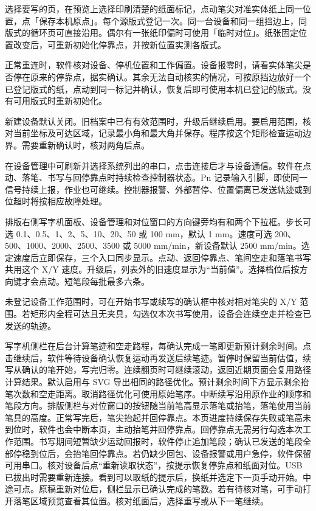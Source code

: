 选择要写的页，在预览上选择印刷清楚的纸面标记，点动笔尖对准实体纸上同一位置，点「保存本机原点」。每个源版式登记一次。同一台设备和同一组挡边上，同版式的循环页可直接沿用。偶尔有一张纸印偏时可使用「临时对位」。纸张固定位置改变后，可重新初始化停靠点，并按新位置实测各版式。

正常重连时，软件核对设备、停机位置和工作偏置。设备报零时，请看实体笔尖是否停在原来的停靠点，据实确认。其余无法自动核实的情况，可按原挡边放好一个已登记版式的纸，点动到同一标记并确认，恢复后即可使用本机已登记的版式。没有可用版式时重新初始化。

新建设备默认关闭。旧档案中已有有效范围时，升级后继续启用。要启用范围，核对当前坐标及可达区域，记录最小角和最大角并保存。程序按这个矩形检查运动边界。需要重新确认时，核对两角后点。

在设备管理中可刷新并选择系统列出的串口，点击连接后才与设备通信。软件在点动、落笔、书写与回停靠点时持续检查控制器状态。Pn 记录输入引脚，即使同一信号持续上报，作业也可继续。控制器报警、外部暂停、位置偏离已发送轨迹或到位超时将按相应故障处理。

排版右侧写字机面板、设备管理和对位窗口的方向键旁均有和两个下拉框。步长可选 0.1、0.5、1、2、5、10、20、50 或 100 mm，默认 1 mm。速度可选 200、500、1000、2000、2500、3500 或 5000 mm/min，新设备默认 2500 mm/min。选定速度后立即保存，三个入口同步显示。点动、返回停靠点、笔间空走和落笔书写共用这个 X/Y 速度。升级后，列表外的旧速度显示为“当前值”。选择档位后按方向键才会点动。短笔段每批最多六条。

未登记设备工作范围时，可在开始书写或续写的确认框中核对相对笔尖的 X/Y 范围。若矩形内全程可达且无夹具，勾选仅本次书写使用，设备会连续空走并检查已发送的轨迹。

写字机侧栏在后台计算笔迹和空走路程，每确认完成一笔即更新预计剩余时间。点击继续后，软件等待设备确认恢复运动再发送后续笔迹。暂停时保留当前估值，续写从确认的笔开始，写完归零。连续翻页时可继续滚动，返回近期页面会复用路径计算结果。默认启用与 SVG 导出相同的路径优化。预计剩余时间下方显示剩余抬笔次数和空走距离。取消路径优化可使用原始笔序。中断续写沿用原作业的顺序和笔段方向。排版侧栏与对位窗口的按钮随当前笔高显示落笔或抬笔，落笔使用当前笔具的高度。正常写完后，笔尖抬起并回停靠点。本页进度持续保存失败或笔高未到位时，软件也会中断本页，主动抬笔并回停靠点。回停靠点无需另行勾选本次工作范围。书写期间短暂缺少运动回报时，软件停止追加笔段；确认已发送的笔段全部停稳到位后，会抬笔回停靠点。若仍缺少回包、设备报警或用户急停，软件保留可用串口。核对设备后点“重新读取状态”，按提示恢复停靠点和纸面对位。USB 已拔出时需要重新连接。看到可以取纸的提示后，换纸并选定下一页手动开始。中途可点。原稿重新对位后，侧栏显示已确认完成的笔数。若有待核对笔，可手动打开落笔区域预览查看其位置。核对纸面后，选择重写或从下一笔继续。

